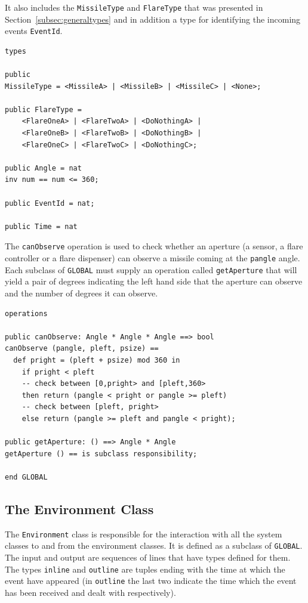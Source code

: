 \documentclass{overturerepchap}
\begin{document}
It also includes the \texttt{MissileType} and \texttt{FlareType} that
was presented in Section~\ref{subsec:generaltypes} and in addition a 
type for identifying the incoming events \texttt{EventId}.

\begin{lstlisting}
types

public 
MissileType = <MissileA> | <MissileB> | <MissileC> | <None>;

public FlareType =
    <FlareOneA> | <FlareTwoA> | <DoNothingA> | 
    <FlareOneB> | <FlareTwoB> | <DoNothingB> | 
    <FlareOneC> | <FlareTwoC> | <DoNothingC>;

public Angle = nat
inv num == num <= 360;

public EventId = nat;

public Time = nat
\end{lstlisting}

The \texttt{canObserve} operation is used to check whether an
aperture (a sensor, a flare controller or a flare dispenser) 
can observe a missile coming at the \texttt{pangle} angle. Each subclass 
of \texttt{GLOBAL} must supply an operation called \texttt{getAperture}
that will yield a pair of degrees indicating the left hand side that the 
aperture can observe and the number of degrees it can observe.
 
\begin{lstlisting}
operations

public canObserve: Angle * Angle * Angle ==> bool
canObserve (pangle, pleft, psize) ==
  def pright = (pleft + psize) mod 360 in
    if pright < pleft
    -- check between [0,pright> and [pleft,360>
    then return (pangle < pright or pangle >= pleft)
    -- check between [pleft, pright>
    else return (pangle >= pleft and pangle < pright);
       
public getAperture: () ==> Angle * Angle
getAperture () == is subclass responsibility;

end GLOBAL
\end{lstlisting}

\subsection{The Environment Class}

The \texttt{Environment} class is responsible for the interaction with
all the system classes to and from the environment classes. It is
defined as a subclass of \texttt{GLOBAL}. The input and output are sequences of
lines that have types defined for them. The types \texttt{inline} and 
\texttt{outline} are tuples ending with the time at which the event have
appeared (in \texttt{outline} the last two indicate the time which the event 
has been received and dealt with respectively).
\end{document}
